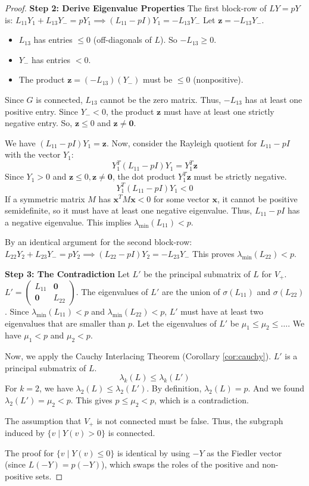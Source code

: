 \documentclass[12pt,a4paper]{report}
\theoremstyle{plain}
\theoremstyle{definition}
\theoremstyle{remark}
\begin{document}
\begin{proof}
\textbf{Step 2: Derive Eigenvalue Properties}
The first block-row of $LY=pY$ is:
$L_{11}Y_1 + L_{13}Y_- = pY_1 \implies (L_{11} - pI)Y_1 = -L_{13}Y_-$
Let $\bm{z} = -L_{13}Y_-$.
\begin{itemize}
    \item $L_{13}$ has entries $\le 0$ (off-diagonals of $L$). So $-L_{13} \ge 0$.
    \item $Y_-$ has entries $< 0$.
    \item The product $\bm{z} = (-L_{13})(Y_-)$ must be $\le 0$ (nonpositive).
\end{itemize}
Since $G$ is connected, $L_{13}$ cannot be the zero matrix. Thus, $-L_{13}$ has at least one positive entry. Since $Y_- < 0$, the product $\bm{z}$ must have at least one strictly negative entry.
So, $\bm{z} \le 0$ and $\bm{z} \ne \bm{0}$.

We have $(L_{11} - pI)Y_1 = \bm{z}$.
Now, consider the Rayleigh quotient for $L_{11}-pI$ with the vector $Y_1$:
$$ Y_1^T (L_{11} - pI) Y_1 = Y_1^T \bm{z} $$
Since $Y_1 > 0$ and $\bm{z} \le 0, \bm{z} \ne \bm{0}$, the dot product $Y_1^T \bm{z}$ must be strictly negative.
$$ Y_1^T (L_{11} - pI) Y_1 < 0 $$
If a symmetric matrix $M$ has $\bm{x}^T M \bm{x} < 0$ for some vector $\bm{x}$, it cannot be positive semidefinite, so it must have at least one negative eigenvalue.
Thus, $L_{11} - pI$ has a negative eigenvalue. This implies $\lambda_{\min}(L_{11}) < p$.

By an identical argument for the second block-row:
$L_{22}Y_2 + L_{23}Y_- = pY_2 \implies (L_{22} - pI)Y_2 = -L_{23}Y_-$
This proves $\lambda_{\min}(L_{22}) < p$.

\textbf{Step 3: The Contradiction}
Let $L'$ be the principal submatrix of $L$ for $V_+$. $L' = \begin{pmatrix} L_{11} & \mathbf{0} \\ \mathbf{0} & L_{22} \end{pmatrix}$.
The eigenvalues of $L'$ are the union of $\sigma(L_{11})$ and $\sigma(L_{22})$.
Since $\lambda_{\min}(L_{11}) < p$ and $\lambda_{\min}(L_{22}) < p$, $L'$ must have at least two eigenvalues that are smaller than $p$.
Let the eigenvalues of $L'$ be $\mu_1 \le \mu_2 \le \dots$. We have $\mu_1 < p$ and $\mu_2 < p$.

Now, we apply the Cauchy Interlacing Theorem (Corollary \ref{cor:cauchy}). $L'$ is a principal submatrix of $L$.
$$ \lambda_k(L) \le \lambda_k(L') $$
For $k=2$, we have $\lambda_2(L) \le \lambda_2(L')$.
By definition, $\lambda_2(L) = p$. And we found $\lambda_2(L') = \mu_2 < p$.
This gives $p \le \mu_2 < p$, which is a contradiction.

The assumption that $V_+$ is not connected must be false.
Thus, the subgraph induced by $\{v \mid Y(v) > 0\}$ is connected.

The proof for $\{v \mid Y(v) \le 0\}$ is identical by using $-Y$ as the Fiedler vector (since $L(-Y) = p(-Y)$), which swaps the roles of the positive and non-positive sets.
\end{proof}
\end{document}
